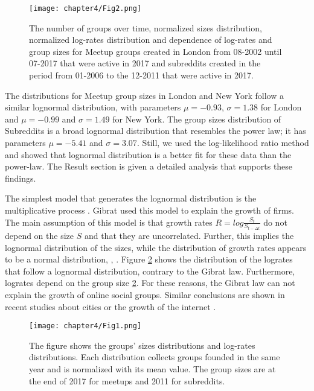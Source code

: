 \begin{figure}[h]
	\centering
	\texttt{[image: chapter4/Fig2.png]}
	\caption[Properties of Meetup and Subreddit groups]{The number of groups over time, normalized sizes distribution, normalized log-rates distribution and dependence of log-rates and group sizes for Meetup groups created in London from 08-2002 until 07-2017 that were active in 2017 and subreddits created in the period from 01-2006 to the  12-2011 that were active in 2017. }
	\label{fig:data1}
\end{figure}   

The distributions for Meetup group sizes in London and New York follow a similar lognormal distribution, with parameters $\mu= -0.93$, $\sigma = 1.38$ for London and $\mu=-0.99$ and $\sigma=1.49$ for New York. The group sizes distribution of Subreddits is a broad lognormal distribution that resembles the power law; it has parameters $\mu= -5.41$ and $\sigma = 3.07$.   Still, we used the log-likelihood ratio method and showed that lognormal distribution is a better fit for these data than the power-law. The Result section is given a detailed analysis that supports these findings.   

The simplest model that generates the lognormal distribution is the multiplicative process \cite{mitzenmacher2004brief}. Gibrat used this model to explain the growth of firms. The main assumption of this model is that growth rates  $R = log\frac{S_t}{S_{t-\Delta t}}$ do not depend on the size $S$ and that they are uncorrelated. Further, this implies the lognormal distribution of the sizes, while the distribution of growth rates appears to be a normal distribution,  \cite{mondani2014fat}, \cite{fu2005growth}. Figure \ref{fig:scale} shows the distribution of the logrates that follow a lognormal distribution, contrary to the Gibrat law. Furthermore, logrates depend on the group size \ref{fig:scale}. For these reasons, the Gibrat law can not explain the growth of online social groups. Similar conclusions are shown in recent studies about cities or the growth of the internet \cite{frasco2014spatially, qian2014origin}.   

\begin{figure}[h]
	\centering
	\texttt{[image: chapter4/Fig1.png]}
	\caption[Universality in the Meetup and Reddit groups]{The figure shows the groups' sizes distributions and log-rates distributions. Each distribution collects groups founded in the same year and is normalized with its mean value. The group sizes are at the end of 2017 for meetups and 2011 for subreddits.}
	\label{fig:scale}
\end{figure}

